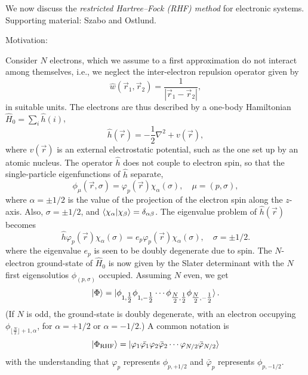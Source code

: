 \documentclass{report}
\theoremstyle{plain}
\theoremstyle{definition}
\begin{document}
We now discuss the \emph{restricted Hartree--Fock (RHF) method} for electronic
systems. Supporting material: Szabo and Ostlund.

Motivation:

Consider $N$ electrons, which we assume to a first approximation do
not interact among themselves, i.e., we neglect the inter-electron
repulsion operator given by
\begin{equation}
  \hat{w}(\vec{r}_1,\vec{r}_2) = \frac{1}{|\vec{r}_1-\vec{r}_2|},
\end{equation}
in suitable units. The electrons are thus described by a one-body
Hamiltonian $\hat{H}_0 = \sum_i \hat{h}(i)$,
\begin{equation}
  \hat{h}(\vec{r}) = -\frac{1}{2}\nabla^2 + v(\vec{r}),
\end{equation}
where $v(\vec{r})$ is an external electrostatic potential, such as the
one set up by an atomic nucleus. The operator $\hat{h}$ does not
couple to electron spin, so that the single-particle eigenfunctions of
$\hat{h}$ separate, 
\begin{equation}
  \phi_{\mu}(\vec{r},\sigma) = \varphi_p(\vec{r})\chi_\alpha(\sigma),
  \quad \mu = (p,\sigma),
\end{equation}
where $\alpha = \pm 1/2$ is the value of the projection of the
electron spin along the $z$-axis. Also, $\sigma=\pm 1/2$, and
$\braket{\chi_\alpha|\chi_\beta} = \delta_{\alpha\beta}$.
The eigenvalue problem of $\hat{h}(\vec{r})$ becomes
\begin{equation}
  \hat{h} \varphi_p(\vec{r})\chi_\alpha(\sigma)  = e_p
  \varphi_p(\vec{r})\chi_\alpha(\sigma), \quad \sigma = \pm 1/2.
\end{equation}
where the eigenvalue $e_p$ is seen to be doubly degenerate due to spin.
The $N$-electron ground-state of $\hat{H}_0$ is now given by the
Slater determinant with the $N$ first eigensolutios
$\phi_{(p,\sigma)}$ occupied. Assuming $N$ even, we get
\begin{equation}
  \ket{\Phi} = \ket{\phi_{1,\tfrac{1}{2}}\phi_{1,-\tfrac{1}{2}} \cdots
    \phi_{\tfrac{N}{2},\tfrac{1}{2}}\phi_{\tfrac{N}{2},-\tfrac{1}{2}}}.
\end{equation}
(If $N$ is odd, the ground-state is doubly
degenerate, with an electron occupying
$\phi_{\lfloor\tfrac{N}{2}\rfloor+1,\alpha}$, for $\alpha=+1/2$ or $\alpha=-1/2$.)
A common notation is 
\begin{equation}
  \ket{\Phi_\text{RHF}} = \ket{\varphi_1 \bar{\varphi_1} \varphi_2\bar{\varphi}_2\cdots
    \varphi_{N/2}\bar{\varphi}_{N/2}} \label{eq:doubly-occupied-slater}
\end{equation}
with the understanding that $\varphi_p$ represents $\phi_{p,+1/2}$ and
$\bar{\varphi}_p$ represents $\phi_{p,-1/2}$.
\end{document}
